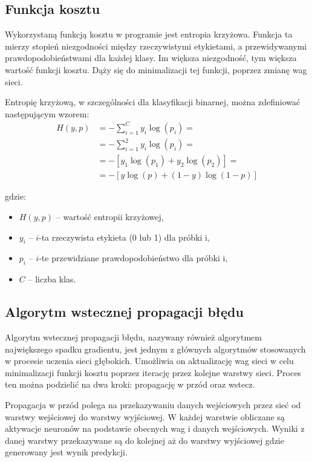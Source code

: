 \documentclass{article}
\begin{document}
\subsection{Funkcja kosztu}
Wykorzystaną funkcją kosztu w programie jest entropia krzyżowa.
Funkcja ta mierzy stopień niezgodności między rzeczywistymi etykietami, a przewidywanymi prawdopodobieństwami dla każdej klasy.
Im większa niezgodność, tym większa wartość funkcji kosztu.
Dąży się do minimalizacji tej funkcji, poprzez zmianę wag sieci.

Entropię krzyżową, w szczególności dla klasyfikacji binarnej, można zdefiniować następującym wzorem:
\begin{align*}
    H(y, p) & = -\sum_{i=1}^{C} y_i \log(p_i) =    \\
            & = -\sum_{i=1}^{2} y_i \log(p_i) =    \\
            & = -[y_1 \log(p_1) + y_2 \log(p_2)] = \\
            & = - [y \log(p) + (1-y) \log(1-p)]
\end{align*}

gdzie:
\begin{itemize}
    \item  \(H(y, p)\) -- wartość entropii krzyżowej,
    \item  \(y_i\) -- \(i\)-ta rzeczywista etykieta (0 lub 1) dla próbki i,
    \item  \(p_i\) -- \(i\)-te przewidziane prawdopodobieństwo dla próbki i,
    \item \(C\) -- liczba klas.
\end{itemize}

\subsection{Algorytm wstecznej propagacji błędu}
Algorytm wstecznej propagacji błędu, nazywany również algorytmem największego spadku gradientu, jest jednym z głównych algorytmów stosowanych w procesie uczenia sieci głębokich.
Umożliwia on aktualizację wag sieci w celu minimalizacji funkcji kosztu poprzez iterację przez kolejne warstwy sieci.
Proces ten można podzielić na dwa kroki: propagację w przód oraz wstecz.

Propagacja w przód polega na przekazywaniu danych wejściowych przez sieć od warstwy wejściowej do warstwy wyjściowej.
W każdej warstwie obliczane są aktywacje neuronów na podstawie obecnych wag i danych wejściowych.
Wyniki z danej warstwy przekazywane są do kolejnej aż do warstwy wyjściowej gdzie generowany jest wynik predykcji.
\end{document}
